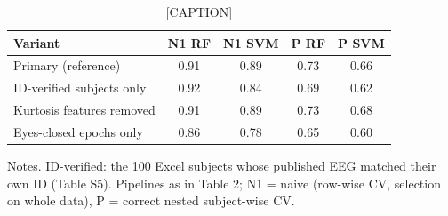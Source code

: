 \begin{table}[htbp]
\centering
\caption{[CAPTION]}
\label{tab:TableS_leak}
\footnotesize
\begin{tabular}{lcccc}
\toprule
Variant & N1 RF & N1 SVM & P RF & P SVM \\
\midrule
Primary (reference) & 0.91 & 0.89 & 0.73 & 0.66 \\
ID-verified subjects only & 0.92 & 0.84 & 0.69 & 0.62 \\
Kurtosis features removed & 0.91 & 0.89 & 0.73 & 0.68 \\
Eyes-closed epochs only & 0.86 & 0.78 & 0.65 & 0.60 \\
\bottomrule
\end{tabular}
\par\smallskip
\begin{minipage}{\textwidth}\raggedright\scriptsize
Notes. ID-verified: the 100 Excel subjects whose published EEG matched their own ID (Table S5). Pipelines as in Table 2; N1 = naive (row-wise CV, selection on whole data), P = correct nested subject-wise CV.
\end{minipage}
\end{table}
